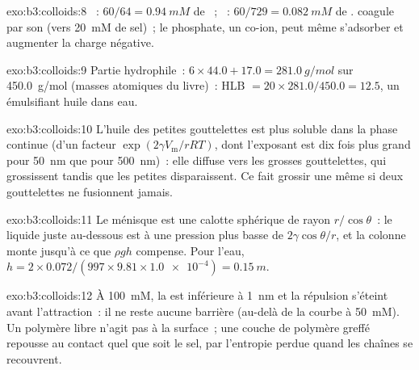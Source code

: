 \begin{solution}{exo:b3:colloids:8}
~: $60/64 = \qty{0.94}{mM}$ de ~; ~: $60/729 = \qty{0.082}{mM}$ de . 
coagule par son  (vers \qty{20}{mM} de sel)~; le phosphate, un
co-ion, peut même s'adsorber et augmenter la charge négative.
\end{solution}

\begin{solution}{exo:b3:colloids:9}
Partie hydrophile~: $6 \times 44.0 + 17.0 = \qty{281.0}{g/mol}$ sur
\qty{450.0}{g/mol} (masses atomiques du livre)~:
HLB $= 20 \times 281.0/450.0 = 12.5$, un émulsifiant huile dans eau.
\end{solution}

\begin{solution}{exo:b3:colloids:10}
L'huile des petites gouttelettes est plus soluble dans la phase continue
(d'un facteur $\exp(2\gamma V_{\mathrm m}/rRT)$, dont l'exposant est dix
fois plus grand pour \qty{50}{nm} que pour \qty{500}{nm})~: elle
diffuse vers les grosses gouttelettes, qui grossissent tandis que les
petites disparaissent. Ce  fait grossir une 
même si deux gouttelettes ne fusionnent jamais.
\end{solution}

\begin{solution}{exo:b3:colloids:11}
Le ménisque est une calotte sphérique de rayon $r/\cos\theta$~: le liquide
juste au-dessous est à une pression plus basse de $2\gamma\cos\theta/r$,
et la colonne monte jusqu'à ce que $\rho gh$ compense. Pour l'eau,
$h = 2 \times 0.072/(997 \times 9.81 \times \num{1.0e-4}) = \qty{0.15}{m}$.
\end{solution}

\begin{solution}{exo:b3:colloids:12}
À \qty{100}{mM}, la  est inférieure à \qty{1}{nm} et la
répulsion s'éteint avant l'attraction~: il ne reste aucune barrière
(au-delà de la courbe à \qty{50}{mM}). Un polymère libre n'agit pas à la
surface~; une couche de polymère greffé repousse au contact quel que soit
le sel, par l'entropie perdue quand les chaînes se recouvrent.
\end{solution}

